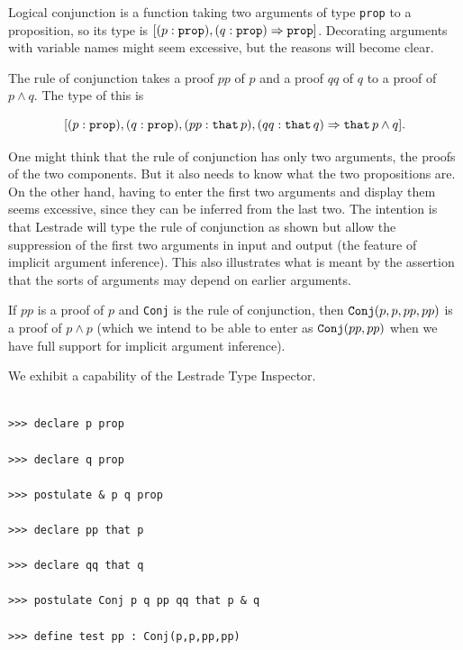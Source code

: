 \documentclass[12pt]{article}
\begin{document}
Logical conjunction is a function taking two arguments of type {\tt prop} to a proposition, so its type is $[(p:{\tt prop}),(q:{\tt prop}) \Rightarrow {\tt prop}]$.  Decorating arguments with variable names might seem excessive, but the reasons will become clear.

The rule of conjunction takes a proof $pp$ of $p$ and a proof $qq$ of $q$ to a proof of $p \wedge q$.    The type of this is 

$$[(p:\verb|prop| ),(q:{\tt prop}),(pp: \verb|that|   \, p),(qq:{\tt that}\, q) \Rightarrow {\tt that}\, p \wedge q].$$

One might think that the rule of conjunction has only two arguments, the proofs of the two components.  But it also needs to know what the two propositions are.  On the other hand, having to enter the first two arguments and display them seems excessive, since they can be inferred from the last two.  The intention is that Lestrade will type the rule of conjunction as shown but allow the suppression of the first two arguments in input and output (the feature of implicit argument inference).  This also illustrates what is meant by the assertion that the
sorts of arguments may depend on earlier arguments.

If $pp$ is a proof of $p$ and {\tt Conj} is the rule of conjunction, then ${\tt Conj}(p,p,pp,pp)$ is a proof of $p \wedge p$ (which we intend to be able to enter as ${\tt Conj}(pp,pp)$ when we have full support for implicit argument inference).

We exhibit a capability of the Lestrade Type Inspector.

\begin{verbatim}

>>> declare p prop

>>> declare q prop

>>> postulate & p q prop

>>> declare pp that p

>>> declare qq that q

>>> postulate Conj p q pp qq that p & q

>>> define test pp : Conj(p,p,pp,pp)

\end{verbatim}
\end{document}
